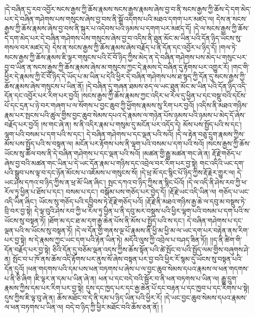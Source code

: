 །དེ་བཞིན་དུ་རབ་འབྱོར་སངས་རྒྱས་ཀྱི་ཆོས་རྣམས་སངས་རྒྱས་རྣམས་ཞེས་བྱ་བ་ནི་སངས་རྒྱས་ཀྱི་ཆོས་དེ་དག་མེད་པར་དེ་བཞིན་གཤེགས་པས་གསུངས་ཞེས་བྱ་བས་ནི་སྒྲོ་འདོགས་པའི་མཐའ་དགག་པར་མཛད་ལ། དེས་ན་སངས་རྒྱས་ཀྱི་ཆོས་རྣམས་ཞེས་བྱ་བས་ནི་སྐུར་པ་འདེབས་པའི་ཉམས་པ་དགག་པར་མཛད་དོ། །དེ་ལ་སངས་རྒྱས་ཀྱི་ཆོས་དེ་དག་མེད་པར་དེ་བཞིན་གཤེགས་པས་གསུངས་ཞེས་བྱ་བ་འདིས་ནི་ཐུན་མོང་མ་ཡིན་པའི་དོན་ཉིད་ཡོངས་སུ་གསལ་བར་མཛད་དེ། དེས་ན་སངས་རྒྱས་ཀྱི་ཆོས་རྣམས་ཞེས་བརྗོད་པ་ནི་དོན་དང་འབྱོར་པ་ཉིད་དོ། །གལ་ཏེ་སངས་རྒྱས་ཀྱི་ཆོས་རྣམས་ཇི་ལྟར་གསུངས་པའི་ངོ་བོ་ཉིད་ཀྱིས་མེད་ན་དེ་བཞིན་གཤེགས་པས་མེད་པ་གསུང་པར་བྱ་བ་ཡིན་ན་སངས་རྒྱས་ཀྱི་ཆོས་རྣམས་ཞེས་མ་གསུངས་ཀྱང་དེ་རྣམས་དེ་བཞིན་དུ་རྟོགས་པར་འགྱུར་རོ། །གང་གི་ཕྱིར་དེ་རྣམས་ཀྱི་ངོ་བོ་ཉིད་དེ་ཡོད་པ་མ་ཡིན་པ་དེའི་ཕྱིར་དེ་བཞིན་གཤེགས་པས་ཐ་སྙད་ཀྱི་དོན་དུ་སངས་རྒྱས་ཀྱི་ཆོས་རྣམས་ཞེས་གསུངས་པ་ཡིན་ནོ། །དེ་བཞིན་དུ་གཞན་ཐམས་ཅད་ལ་ཡང་ཐུན་མོང་མ་ཡིན་པའི་དོན་ཉིད་འདི་དོན་དང་འབྱོར་པར་རིག་པར་བྱའོ། །སངས་རྒྱས་ཀྱི་ཆོས་རྣམས་ཀྱང་འདིར་ཕ་རོལ་དུ་ཕྱིན་པ་དང་བསྡུ་བའི་དངོས་པོ་དང་དྲན་པ་ཉེ་བར་གཞག་པ་ལ་སོགས་པ་བྱང་ཆུབ་ཀྱི་ཕྱོགས་རྣམས་སུ་རིག་པར་བྱའོ། །འདིས་ནི་མཐའ་གཉིས་རྣམ་པར་སྤངས་པའི་ཚུལ་གྱིས་བྱང་ཆུབ་སེམས་དཔའ་དེ་རྣམས་ལ་གཉེན་པོས་ཉམས་པའི་ཉམས་པ་མེད་དོ་ཞེས་བརྗོད་པར་བྱའོ། །ས་གང་ཞེ་ན། ས་ནི་འདིར་རྣམ་པ་གསུམ་དུ་མངོན་པར་འདོད་དེ། མོས་པས་སྤྱོད་པའི་ས་དང་། ལྷག་པའི་བསམ་པ་དག་པའི་ས་དང་། དེ་བཞིན་གཤེགས་པ་དང་ལྡན་པའི་སའོ། །དེ་ལ་རྟེན་བཅུ་དྲུག་རྣམས་ཀྱིས་མོས་པས་སྤྱོད་པའི་ས་བསྟན་ལ། མངོན་པར་རྟོགས་པས་ནི་ལྷག་པའི་བསམ་པ་དག་པའི་སའོ། །སངས་རྒྱས་ཀྱི་ཆོས་ཡོངས་སུ་ཚོལ་བས་ནི་དེ་བཞིན་གཤེགས་པ་དང་ལྡན་པའི་སའོ། །མཚན་གྱི་རྒྱུ་མཚན་གང་ཞེ་ན། རྡོ་རྗེ་གཅོད་པ་ཞེས་བྱ་བའི་མཚན་གང་ཡིན་པ་དེ་ཡང་དོན་རྣམ་པ་གཉིས་དང་འབྲེལ་བར་རིག་པར་བྱ་སྟེ། གང་འདིའི་ཡང་དག་པའི་སྒྲུབ་པས་ལྟ་བ་དང་ཉོན་མོངས་པ་འཇོམས་པ་གསུངས་སོ། །དེ་ཕྲ་མོ་དང་སྙིང་པོ་ཉིད་ཀྱིས་རྡོ་རྗེར་གྱུར་ལ། དེ་ཡང་ཤེས་དཀའ་བ་ཉིད་ཀྱིས་ན་ཕྲ་མོ་ཡིན་ཞིང་། སྤང་དཀའ་བ་ཉིད་ཀྱིས་ན་སྙིང་པོའོ། །དེ་ལ་འདི་ནི་ཤེས་རབ་ཀྱི་ཕ་རོལ་ཏུ་ཕྱིན་པ་ཐོས་པ་དང་། བསམ་པ་དང་། བསྒོམ་པས་གཅོད་པར་བྱེད་དོ། །རྡོ་རྗེ་ཡང་འདི་ཡིན་ལ། གཅོད་པ་ཡང་འདི་ཡིན་ཞིང་། ཡོངས་སུ་གཅོད་པའི་དབྱིབས་ཏེ་རྡོ་རྗེ་གཅོད་པའོ། །རྡོ་རྗེ་ནི་མཐའ་གཉིས་རྒྱ་ཆེ་ལ་དབུ་མ་བསྡུས་ཏེ་བྲི་བར་བྱ་སྟེ། དེ་ལྟ་བུའི་ཤེས་རབ་ཀྱི་ཕ་རོལ་ཏུ་ཕྱིན་པ་ནི་དབུ་མར་བསྡུས་པའི་ཕྱིར་ལྷག་པའི་བསམ་པ་དག་པའི་ས་ཡོངས་སུ་བསྟན་ཏོ། །ཐོག་མ་དང་ཐ་མ་དག་རྒྱ་ཆེན་པོས་ནི་མོས་པ་སྤྱོད་པའི་ས་དང་། དེ་བཞིན་གཤེགས་པ་དང་ལྡན་པའི་ས་ཡོངས་སུ་བསྟན་ཏོ། །དེ་ལ་དོན་གྱི་གནས་ལྔ་པོ་རྣམས་ནི་ཕྱི་མ་ཕྱི་མ་ལ་ཡང་དག་པར་བརྟེན་ནས་རིག་པར་བྱ་སྟེ། ས་དེ་རྣམས་ཀྱང་ཡང་དག་པའི་རྟེན་ཡིན་ཏེ། མདོའི་ལུས་ཀྱི་འབྲེལ་པ་བཤད་ཟིན་ཏོ།། །།ད་ནི་ཚིག་གི་དོན་བརྗོད་པར་བྱ་སྟེ། ཅིའི་དོན་དུ་བཅོམ་ལྡན་འདས་ཀྱིས་ཆོས་སྟོན་པའི་ཚེ་སྤོང་བ་པའི་སྤྱོད་ལམ་གྱིས་བཞུགས་ཤེ་ན། སྤོང་བ་པ་ཁོ་ནས་ཆོས་འདི་རྟོགས་པར་ནུས་སོ་ཞེས་བསྟན་པར་བྱ་བའི་ཕྱིར་རོ་སྙམ་དུ་ཡོངས་སུ་བསྟན་པའི་དོན་དུའོ། །ཕན་གདགས་པའི་དམ་པས་ཕན་བཏགས་པ་ཞེས་པ་ལ་བྱང་ཆུབ་སེམས་དཔའ་རྣམས་ལ་ཕན་གདགས་པ་ནི་ཅི་ཞིག །ཇི་ལྟར་ན་དམ་པ་ཡིན་ཞེ་ན། ཕན་པ་དང་བདེ་བའི་སྦྱོར་བ་ནི་ཕན་བཏགས་པ་ཡིན་ལ། རྒྱུ་དྲུག་རྣམས་ཀྱིས་དམ་པར་རིག་པར་བྱ་སྟེ། དུས་དང་ཁྱད་པར་དང་རྒྱ་ཆེན་པོ་དང་བརྟན་པ་དང་ཁྱབ་པ་དང་རིགས་པ་སྟེ། དུས་ཀྱིས་ཇི་ལྟ་བུ་ཞེ་ན། ཆོས་མཐོང་བ་དེ་ནི་དམ་པ་ཉིད་ཡིན་པའི་ཕྱིར་རོ། །དེ་ཡང་བྱང་ཆུབ་སེམས་དཔའ་རྣམས་ལ་ཕན་བཏགས་པ་ཡིན་ལ། བདེ་བ་ཉིད་ཀྱི་ཕྱིར་མཐོང་བའི་ཆོས་ཅན་ནོ། །
